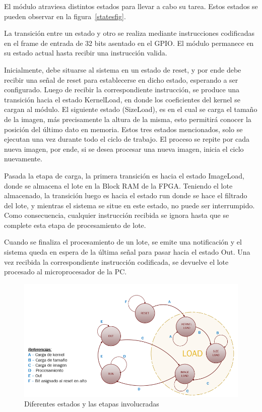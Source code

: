 El módulo atraviesa distintos estados para llevar a cabo su tarea. Estos estados
se pueden observar en la figura~\ref{statesfig}.

La transición entre un estado y
otro se realiza mediante instrucciones codificadas en el frame de entrada de 32
bits asentado en el GPIO. El módulo permanece en su estado actual hasta recibir
una instrucción valida.

Inicialmente, debe situarse al sistema en un estado de reset, y por ende debe
recibir una señal de reset para establecerse en dicho estado, esperando a ser
configurado.
Luego de recibir la correspondiente instrucción, se produce una transición hacia el estado KernelLoad, en donde los coeficientes del kernel se cargan al módulo.
El siguiente estado (SizeLoad), es en el cual se carga el tamaño de la imagen,
más precisamente la altura de la misma, esto permitirá conocer la posición del
último dato en memoria.
Estos tres estados mencionados, solo se ejecutan una vez durante todo el ciclo
de trabajo. El proceso se repite por cada nueva imagen, por ende, si se desea
procesar una nueva imagen, inicia el ciclo nuevamente.

Pasada la etapa de carga, la primera transición es hacia el
estado ImageLoad, donde se almacena el lote en la Block RAM de la FPGA.
Teniendo el lote almacenado, la transición luego es hacia el estado run donde se
hace el filtrado del lote, y mientras el sistema se situe en este estado, no
puede ser interrumpido.
Como consecuencia, cualquier instrucción recibida se ignora hasta que se
complete esta etapa de procesamiento de lote.

Cuando se finaliza el procesamiento de un lote, se emite una notificación y el sistema
queda en espera de la última señal para pasar hacia el estado Out. Una vez recibida la
correspondiente instrucción codificada, se devuelve el lote procesado al
microprocesador de la PC.

\begin{figure}
\centering
\includegraphics{states_2.png}
\caption{Diferentes estados y las etapas involucradas }
\label{statesfig2}
\end{figure}

